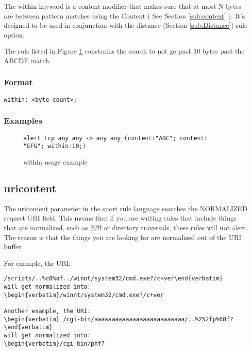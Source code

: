 \documentclass[english]{report}
\begin{document}
The within keyword is a content modifier that makes sure that
at most N bytes are between pattern matches using the Content ( See
Section \ref{sub:content} ).  It's designed to be used in conjunction
with the distance (Section \ref{sub:Distance}) rule option.

The rule listed in Figure \ref{fig:Within} constrains the search to not
go past 10 bytes past the ABCDE match. 

\subsubsection{Format}

\begin{verbatim}
within: <byte count>;
\end{verbatim}

\subsubsection{Examples}

\begin{figure}[!hbpt]
\begin{verbatim}
alert tcp any any -> any any (content:"ABC"; content: "EFG"; within:10;)
\end{verbatim}
\caption{within usage example \label{fig:Within}}
\end{figure}


\subsection{uricontent}

The uricontent parameter in the snort rule language searches the NORMALIZED
request \textsc{URI} field.  This means that if you are writing rules that include
things that are normalized, such as \%2f or directory traversals, these rules
will not alert.  The reason is that the things you are looking for are
normalized out of the URI buffer.  

For example, the URI: 
\begin{verbatim}/scripts/..%c0%af../winnt/system32/cmd.exe?/c+ver\end{verbatim}
will get normalized into:
\begin{verbatim}/winnt/system32/cmd.exe?/c+ver

Another example, the URI:
\begin{verbatim} /cgi-bin/aaaaaaaaaaaaaaaaaaaaaaaaaa/..%252fp%68f? \end{verbatim}
will get normalized into:
\begin{verbatim}/cgi-bin/phf?\end{verbatim}
\end{document}
